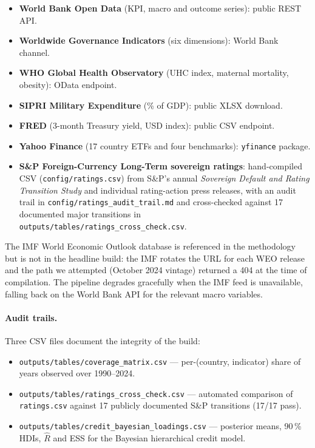 \begin{itemize}\setlength{\itemsep}{0.15em}
  \item \textbf{World Bank Open Data} (KPI, macro and outcome series): public REST API.
  \item \textbf{Worldwide Governance Indicators} (six dimensions): World Bank channel.
  \item \textbf{WHO Global Health Observatory} (UHC index, maternal mortality, obesity): OData endpoint.
  \item \textbf{SIPRI Military Expenditure} (\% of GDP): public XLSX download.
  \item \textbf{FRED} (3-month Treasury yield, USD index): public CSV endpoint.
  \item \textbf{Yahoo Finance} (17 country ETFs and four benchmarks): \texttt{yfinance} package.
  \item \textbf{S\&P Foreign-Currency Long-Term sovereign ratings}: hand-compiled CSV (\texttt{config/ratings.csv}) from S\&P's annual \emph{Sovereign Default and Rating Transition Study} and individual rating-action press releases, with an audit trail in \texttt{config/ratings\_audit\_trail.md} and cross-checked against 17 documented major transitions in \texttt{outputs/tables/ratings\_cross\_check.csv}.
\end{itemize}

The IMF World Economic Outlook database is referenced in the methodology but is not in the headline build: the IMF rotates the URL for each WEO release and the path we attempted (October 2024 vintage) returned a 404 at the time of compilation. The pipeline degrades gracefully when the IMF feed is unavailable, falling back on the World Bank API for the relevant macro variables.

\paragraph{Audit trails.} Three CSV files document the integrity of the build:

\begin{itemize}\setlength{\itemsep}{0.10em}
  \item \texttt{outputs/tables/coverage\_matrix.csv} --- per-(country, indicator) share of years observed over 1990--2024.
  \item \texttt{outputs/tables/ratings\_cross\_check.csv} --- automated comparison of \texttt{ratings.csv} against 17 publicly documented S\&P transitions (17/17 pass).
  \item \texttt{outputs/tables/credit\_bayesian\_loadings.csv} --- posterior means, 90\,\% HDIs, $\widehat{R}$ and ESS for the Bayesian hierarchical credit model.
\end{itemize}

